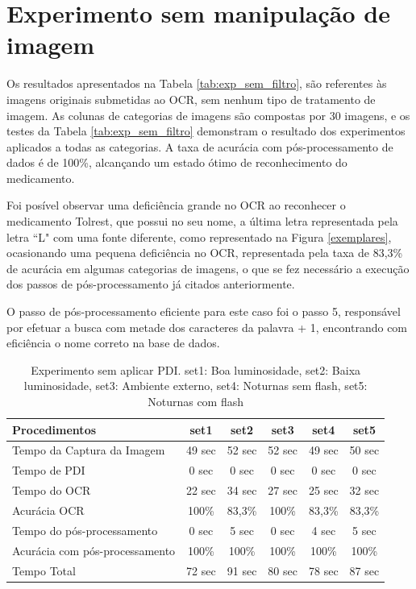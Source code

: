\section{Experimento sem manipulação de imagem}
Os resultados apresentados na Tabela \ref{tab:exp_sem_filtro}, são referentes às imagens originais submetidas ao OCR, sem nenhum tipo de tratamento de imagem. As colunas de categorias de imagens são compostas por 30 imagens, e os testes da Tabela \ref{tab:exp_sem_filtro} demonstram o resultado dos experimentos aplicados a todas as categorias. A taxa de acurácia com pós-processamento de dados é de 100\%, alcançando um estado ótimo de reconhecimento do medicamento. 

Foi posível observar uma deficiência grande no OCR ao reconhecer o medicamento Tolrest, que possui no seu nome, a última letra representada pela letra ``L" com uma fonte diferente, como representado na Figura \ref{exemplares}, ocasionando uma pequena deficiência no OCR, representada pela taxa de 83,3\% de acurácia em algumas categorias de imagens, o que se fez necessário a execução dos passos de pós-processamento já citados anteriormente.

O passo de pós-processamento eficiente para este caso foi o passo 5, responsável por efetuar a busca com metade dos caracteres da palavra + 1, encontrando com eficiência o nome correto na base de dados.



\begin{table}[]
\centering
\begin{tabular}{lccccc}
\hline
Procedimentos & set1 & set2 & set3 & set4 & set5 \\ \hline
Tempo da Captura da Imagem & 49 sec & 52 sec & 52 sec & 49 sec & 50 sec \\
Tempo de PDI & 0 sec & 0 sec & 0 sec & 0 sec & 0 sec \\
Tempo do OCR & 22 sec & 34 sec & 27 sec & 25 sec & 32 sec \\
Acurácia OCR & 100\% & 83,3\% & 100\% & 83,3\% & 83,3\% \\
Tempo do pós-processamento & 0 sec & 5 sec & 0 sec & 4 sec & 5 sec \\
Acurácia com pós-processamento & 100\% & 100\% & 100\% & 100\% & 100\% \\
Tempo Total & 72 sec & 91 sec & 80 sec & 78 sec & 87 sec \\ \hline
\end{tabular}
\caption{Experimento sem aplicar PDI. set1: Boa luminosidade, set2: Baixa luminosidade, set3: Ambiente externo, set4: Noturnas sem flash, set5: Noturnas com flash}
\label{tab:exp_sem_filtro}
	\label{fig:exp_sem_filtro}
\end{table}


